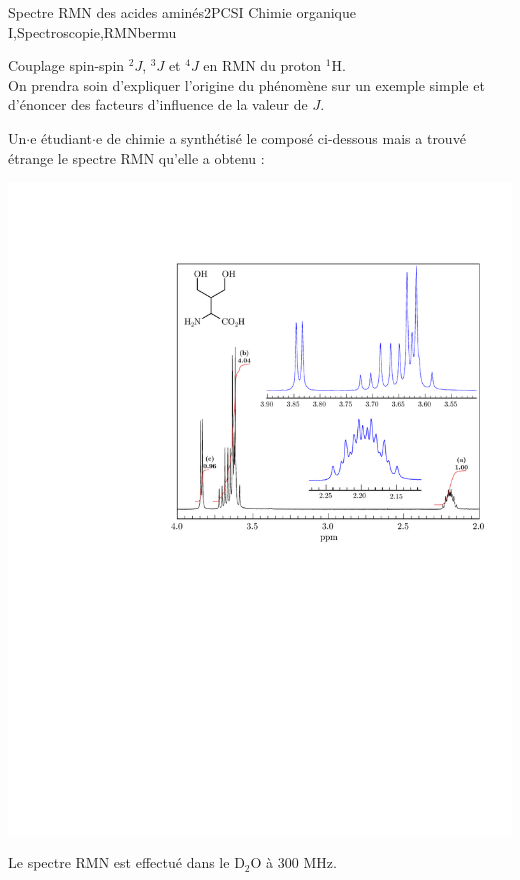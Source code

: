 
\begin{exercise}{Spectre RMN des acides aminés}{2}{PCSI}
{Chimie organique I,Spectroscopie,RMN}{bermu}

\begin{questions}
\questioncours Couplage spin-spin $^{2}J$, $^{3}J$ et $^{4}J$ en RMN du proton $^{1}$H. \\
On prendra soin d'expliquer l'origine du phénomène sur un exemple simple et d'énoncer des facteurs d'influence de la valeur de $J$.

\begin{EnvUplevel}
    Un$\cdot$e étudiant$\cdot$e de chimie a synthétisé le composé ci-dessous mais a trouvé étrange le spectre RMN qu'elle a obtenu :
    
    \noindent\includegraphics[width=\linewidth]{chimiePC/orga/acideamine.pdf}
    
    Le spectre RMN est effectué dans le $\mathrm{D_2O}$ à 300 MHz.
    

\end{EnvUplevel}
\end{questions}
\end{exercise}
